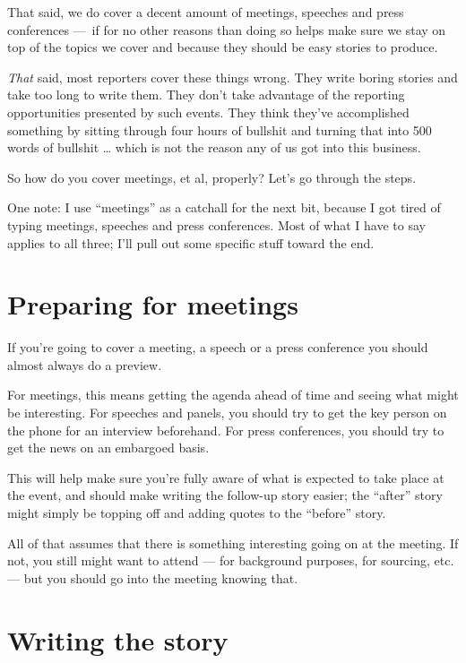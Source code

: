 \documentclass[
  12pt,
  american,
  letterpaperpaper,
  extrafontsizes,onecolumn,openright
  ]{memoir}
\begin{document}
That said, we do cover a decent amount of meetings, speeches and press conferences ---~if for no other reasons than doing so helps make sure we stay on top of the topics we cover and because they should be easy stories to produce.

\emph{That} said, most reporters cover these things wrong. They write boring stories and take too long to write them. They don't take advantage of the reporting opportunities presented by such events. They think they've accomplished something by sitting through four hours of bullshit and turning that into 500 words of bullshit \ldots{} which is not the reason any of us got into this business.

So how do you cover meetings, et al, properly? Let's go through the steps.

One note: I use \enquote{meetings} as a catchall for the next bit, because I got tired of typing meetings, speeches and press conferences. Most of what I have to say applies to all three; I'll pull out some specific stuff toward the end.

\hypertarget{preparing-for-meetings}{%
\section*{Preparing for meetings}\label{preparing-for-meetings}}

If you're going to cover a meeting, a speech or a press conference you should almost always do a preview.

For meetings, this means getting the agenda ahead of time and seeing what might be interesting. For speeches and panels, you should try to get the key person on the phone for an interview beforehand. For press conferences, you should try to get the news on an embargoed basis.

This will help make sure you're fully aware of what is expected to take place at the event, and should make writing the follow-up story easier; the \enquote{after} story might simply be topping off and adding quotes to the \enquote{before} story.

All of that assumes that there is something interesting going on at the meeting. If not, you still might want to attend --- for background purposes, for sourcing, etc. --- but you should go into the meeting knowing that.

\hypertarget{writing-the-story}{%
\section*{Writing the story}\label{writing-the-story}}
\end{document}

